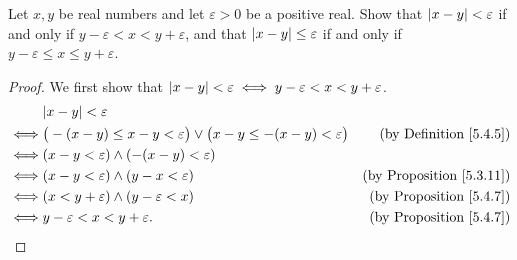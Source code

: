 \begin{exercise}\label{ex 5.4.6}
    Let \(x, y\) be real numbers and let \(\varepsilon > 0\) be a positive real.
    Show that \(\abs*{x - y} < \varepsilon\) if and only if \(y - \varepsilon < x < y + \varepsilon\), and that \(\abs*{x - y} \leq \varepsilon\) if and only if \(y - \varepsilon \leq x \leq y + \varepsilon\).
\end{exercise}

\begin{proof}
    We first show that \(\abs*{x - y} < \varepsilon \iff y - \varepsilon < x < y + \varepsilon\).
    \begin{align*}
             & \abs*{x - y} < \varepsilon                                                                                                          \\
        \iff & \big(-(x - y) \leq x - y < \varepsilon\big) \lor \big(x - y \leq -(x - y) < \varepsilon\big) & \text{(by Definition \ref{5.4.5})}   \\
        \iff & (x - y < \varepsilon) \land (-(x - y) < \varepsilon)                                                                                \\
        \iff & (x - y < \varepsilon) \land (y - x < \varepsilon)                                            & \text{(by Proposition \ref{5.3.11})} \\
        \iff & (x < y + \varepsilon) \land (y - \varepsilon < x)                                            & \text{(by Proposition \ref{5.4.7})}  \\
        \iff & y - \varepsilon < x < y + \varepsilon.                                                       & \text{(by Proposition \ref{5.4.7})}
    \end{align*}


\end{proof}
